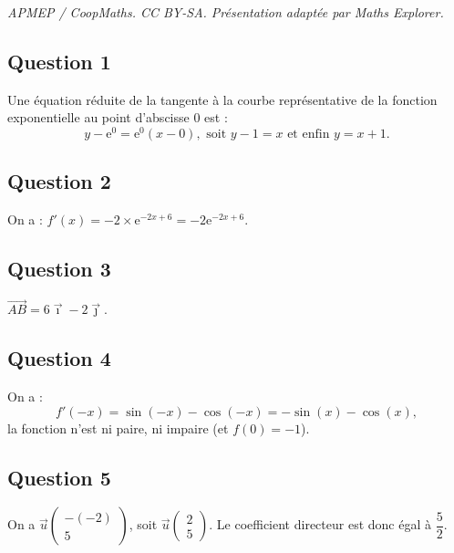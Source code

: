\documentclass[10pt]{article}
\providecommand{\e}{{\mathrm{e}}}
\begin{document}
\noindent\textit{APMEP / CoopMaths. CC BY-SA. Présentation adaptée par Maths Explorer.}\par\medskip
\subsection*{Question 1}

Une équation réduite de la tangente à la courbe représentative de la fonction exponentielle au point d'abscisse 0 est :
\[
y - \e^0 = \e^0(x - 0), \text{ soit } y - 1 = x \text{ et enfin } y = x + 1.
\]

\subsection*{Question 2}

On a : \( f'(x) = -2 \times \e^{-2x + 6} = -2 \e^{-2x + 6} \).

\subsection*{Question 3}

\(\overrightarrow{AB} = 6\vec{\imath} - 2\vec{\jmath}\).

\subsection*{Question 4}

On a :
\[
f'(-x) = \sin(-x) - \cos(-x) = -\sin(x) - \cos(x),
\]
la fonction n'est ni paire, ni impaire (et \( f(0) = -1 \)).

\subsection*{Question 5}

On a \(\vec{u} \begin{pmatrix} -(-2) \\ 5 \end{pmatrix}\), soit \(\vec{u} \begin{pmatrix} 2 \\ 5 \end{pmatrix}\).
Le coefficient directeur est donc égal à \( \dfrac{5}{2} \).
\end{document}
